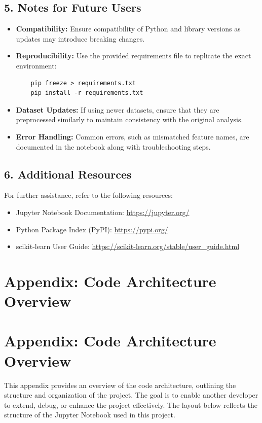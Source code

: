 \documentclass[10pt,twocolumn]{article}
\begin{document}
\subsection*{5. Notes for Future Users}
\begin{itemize}
    \item \textbf{Compatibility:} Ensure compatibility of Python and library versions as updates may introduce breaking changes.
    \item \textbf{Reproducibility:} Use the provided requirements file to replicate the exact environment:
    \begin{verbatim}
    pip freeze > requirements.txt
    pip install -r requirements.txt
    \end{verbatim}
    \item \textbf{Dataset Updates:} If using newer datasets, ensure that they are preprocessed similarly to maintain consistency with the original analysis.
    \item \textbf{Error Handling:} Common errors, such as mismatched feature names, are documented in the notebook along with troubleshooting steps.
\end{itemize}

\subsection*{6. Additional Resources}
For further assistance, refer to the following resources:
\begin{itemize}
    \item Jupyter Notebook Documentation: \url{https://jupyter.org/}
    \item Python Package Index (PyPI): \url{https://pypi.org/}
    \item scikit-learn User Guide: \url{https://scikit-learn.org/stable/user_guide.html}
\end{itemize}

\newpage

\section*{Appendix: Code Architecture Overview}


\section*{Appendix: Code Architecture Overview}

This appendix provides an overview of the code architecture, outlining the structure and organization of the project. The goal is to enable another developer to extend, debug, or enhance the project effectively. The layout below reflects the structure of the Jupyter Notebook used in this project.
\end{document}
